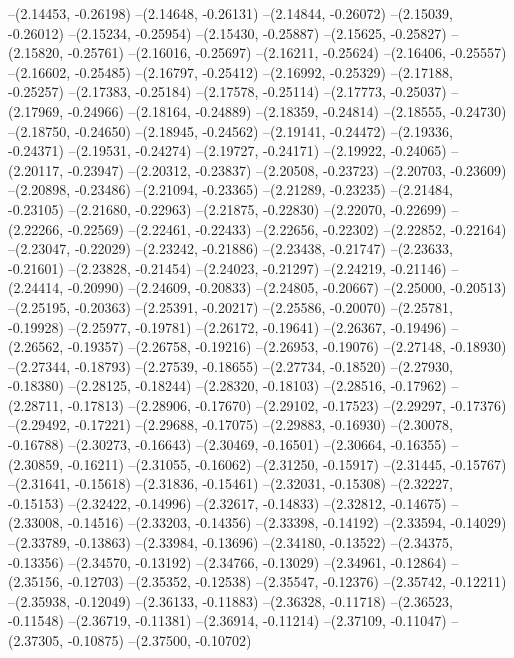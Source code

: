 --(2.14453, -0.26198)
--(2.14648, -0.26131)
--(2.14844, -0.26072)
--(2.15039, -0.26012)
--(2.15234, -0.25954)
--(2.15430, -0.25887)
--(2.15625, -0.25827)
--(2.15820, -0.25761)
--(2.16016, -0.25697)
--(2.16211, -0.25624)
--(2.16406, -0.25557)
--(2.16602, -0.25485)
--(2.16797, -0.25412)
--(2.16992, -0.25329)
--(2.17188, -0.25257)
--(2.17383, -0.25184)
--(2.17578, -0.25114)
--(2.17773, -0.25037)
--(2.17969, -0.24966)
--(2.18164, -0.24889)
--(2.18359, -0.24814)
--(2.18555, -0.24730)
--(2.18750, -0.24650)
--(2.18945, -0.24562)
--(2.19141, -0.24472)
--(2.19336, -0.24371)
--(2.19531, -0.24274)
--(2.19727, -0.24171)
--(2.19922, -0.24065)
--(2.20117, -0.23947)
--(2.20312, -0.23837)
--(2.20508, -0.23723)
--(2.20703, -0.23609)
--(2.20898, -0.23486)
--(2.21094, -0.23365)
--(2.21289, -0.23235)
--(2.21484, -0.23105)
--(2.21680, -0.22963)
--(2.21875, -0.22830)
--(2.22070, -0.22699)
--(2.22266, -0.22569)
--(2.22461, -0.22433)
--(2.22656, -0.22302)
--(2.22852, -0.22164)
--(2.23047, -0.22029)
--(2.23242, -0.21886)
--(2.23438, -0.21747)
--(2.23633, -0.21601)
--(2.23828, -0.21454)
--(2.24023, -0.21297)
--(2.24219, -0.21146)
--(2.24414, -0.20990)
--(2.24609, -0.20833)
--(2.24805, -0.20667)
--(2.25000, -0.20513)
--(2.25195, -0.20363)
--(2.25391, -0.20217)
--(2.25586, -0.20070)
--(2.25781, -0.19928)
--(2.25977, -0.19781)
--(2.26172, -0.19641)
--(2.26367, -0.19496)
--(2.26562, -0.19357)
--(2.26758, -0.19216)
--(2.26953, -0.19076)
--(2.27148, -0.18930)
--(2.27344, -0.18793)
--(2.27539, -0.18655)
--(2.27734, -0.18520)
--(2.27930, -0.18380)
--(2.28125, -0.18244)
--(2.28320, -0.18103)
--(2.28516, -0.17962)
--(2.28711, -0.17813)
--(2.28906, -0.17670)
--(2.29102, -0.17523)
--(2.29297, -0.17376)
--(2.29492, -0.17221)
--(2.29688, -0.17075)
--(2.29883, -0.16930)
--(2.30078, -0.16788)
--(2.30273, -0.16643)
--(2.30469, -0.16501)
--(2.30664, -0.16355)
--(2.30859, -0.16211)
--(2.31055, -0.16062)
--(2.31250, -0.15917)
--(2.31445, -0.15767)
--(2.31641, -0.15618)
--(2.31836, -0.15461)
--(2.32031, -0.15308)
--(2.32227, -0.15153)
--(2.32422, -0.14996)
--(2.32617, -0.14833)
--(2.32812, -0.14675)
--(2.33008, -0.14516)
--(2.33203, -0.14356)
--(2.33398, -0.14192)
--(2.33594, -0.14029)
--(2.33789, -0.13863)
--(2.33984, -0.13696)
--(2.34180, -0.13522)
--(2.34375, -0.13356)
--(2.34570, -0.13192)
--(2.34766, -0.13029)
--(2.34961, -0.12864)
--(2.35156, -0.12703)
--(2.35352, -0.12538)
--(2.35547, -0.12376)
--(2.35742, -0.12211)
--(2.35938, -0.12049)
--(2.36133, -0.11883)
--(2.36328, -0.11718)
--(2.36523, -0.11548)
--(2.36719, -0.11381)
--(2.36914, -0.11214)
--(2.37109, -0.11047)
--(2.37305, -0.10875)
--(2.37500, -0.10702)
